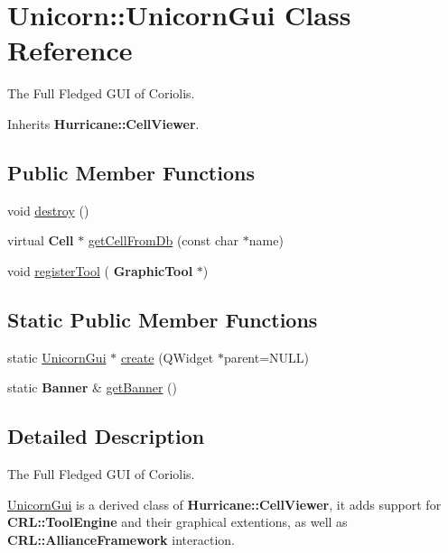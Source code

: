 \hypertarget{classUnicorn_1_1UnicornGui}{}\section{Unicorn\+:\+:Unicorn\+Gui Class Reference}
\label{classUnicorn_1_1UnicornGui}


The Full Fledged G\+UI of Coriolis.  




Inherits \textbf{ Hurricane\+::\+Cell\+Viewer}.

\subsection*{Public Member Functions}
\begin{DoxyCompactItemize}
\item 
void \mbox{\hyperlink{classUnicorn_1_1UnicornGui_a7cff59c0e315b6f46f7cb4454732cd7a}{destroy}} ()
\item 
virtual \textbf{ Cell} $\ast$ \mbox{\hyperlink{classUnicorn_1_1UnicornGui_a698cb62a4c8df9fd6b7d626fb44cc439}{get\+Cell\+From\+Db}} (const char $\ast$name)
\item 
void \mbox{\hyperlink{classUnicorn_1_1UnicornGui_a89346bccf1908c92786987d046aa6175}{register\+Tool}} (\textbf{ Graphic\+Tool} $\ast$)
\end{DoxyCompactItemize}
\subsection*{Static Public Member Functions}
\begin{DoxyCompactItemize}
\item 
static \mbox{\hyperlink{classUnicorn_1_1UnicornGui}{Unicorn\+Gui}} $\ast$ \mbox{\hyperlink{classUnicorn_1_1UnicornGui_a8a7a37531e1596b9396c61598ee55bc2}{create}} (Q\+Widget $\ast$parent=N\+U\+LL)
\item 
static \textbf{ Banner} \& \mbox{\hyperlink{classUnicorn_1_1UnicornGui_a87215204ace67db47db09f5d9e78b85e}{get\+Banner}} ()
\end{DoxyCompactItemize}


\subsection{Detailed Description}
The Full Fledged G\+UI of Coriolis. 

\mbox{\hyperlink{classUnicorn_1_1UnicornGui}{Unicorn\+Gui}} is a derived class of \textbf{ Hurricane\+::\+Cell\+Viewer}, it adds support for \textbf{ C\+R\+L\+::\+Tool\+Engine} and their graphical extentions, as well as \textbf{ C\+R\+L\+::\+Alliance\+Framework} interaction. 

